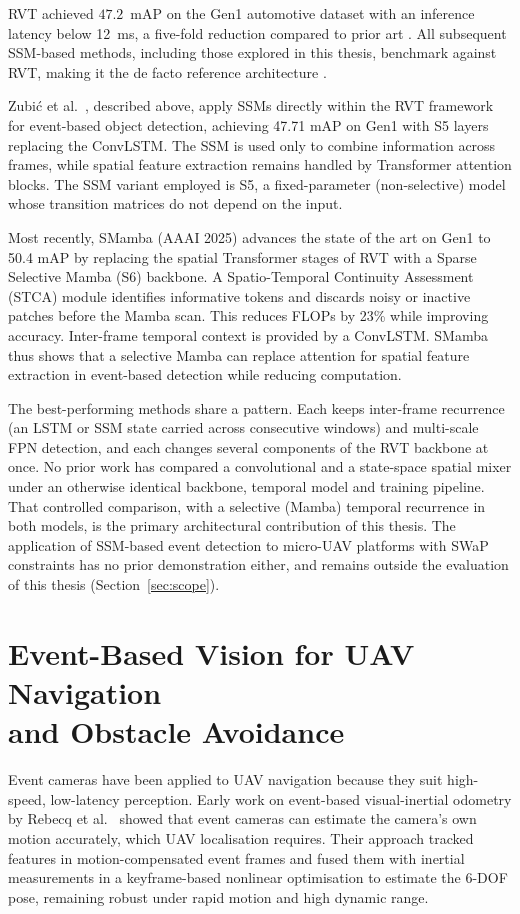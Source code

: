 \documentclass[11pt, a4paper]{report}
\begin{document}
RVT achieved $47.2$~mAP on the Gen1 automotive dataset with an inference latency below 12~ms, a five-fold reduction compared to prior art \cite{gehrig2023recurrent}. All subsequent SSM-based methods, including those explored in this thesis, benchmark against RVT, making it the de facto reference architecture \cite{gehrig2023recurrent, zubic2024state, yang2025smamba}.

Zubi\'{c} et al.~\cite{zubic2024state}, described above, apply SSMs directly within the RVT framework for event-based object detection, achieving 47.71 mAP on Gen1 with S5 layers replacing the ConvLSTM. The SSM is used only to combine information across frames, while spatial feature extraction remains handled by Transformer attention blocks. The SSM variant employed is S5, a fixed-parameter (non-selective) model whose transition matrices do not depend on the input.

Most recently, SMamba \cite{yang2025smamba} (AAAI 2025) advances the state of the art on Gen1 to 50.4 mAP by replacing the spatial Transformer stages of RVT with a Sparse Selective Mamba (S6) backbone. A Spatio-Temporal Continuity Assessment (STCA) module identifies informative tokens and discards noisy or inactive patches before the Mamba scan. This reduces FLOPs by 23\% while improving accuracy. Inter-frame temporal context is provided by a ConvLSTM. SMamba thus shows that a selective Mamba can replace attention for spatial feature extraction in event-based detection while reducing computation.

The best-performing methods share a pattern. Each keeps inter-frame recurrence (an LSTM or SSM state carried across consecutive windows) and multi-scale FPN detection, and each changes several components of the RVT backbone at once. No prior work has compared a convolutional and a state-space spatial mixer under an otherwise identical backbone, temporal model and training pipeline. That controlled comparison, with a selective (Mamba) temporal recurrence in both models, is the primary architectural contribution of this thesis. The application of SSM-based event detection to micro-UAV platforms with SWaP constraints has no prior demonstration either, and remains outside the evaluation of this thesis (Section~\ref{sec:scope}).

\section[Event-Based Vision for UAV Navigation and Obstacle Avoidance]{Event-Based Vision for UAV Navigation\\ and Obstacle Avoidance}
Event cameras have been applied to UAV navigation because they suit high-speed, low-latency perception. Early work on event-based visual-inertial odometry by Rebecq et al.~\cite{rebecq2017real} showed that event cameras can estimate the camera's own motion accurately, which UAV localisation requires. Their approach tracked features in motion-compensated event frames and fused them with inertial measurements in a keyframe-based nonlinear optimisation to estimate the 6-DOF pose, remaining robust under rapid motion and high dynamic range.
\end{document}
